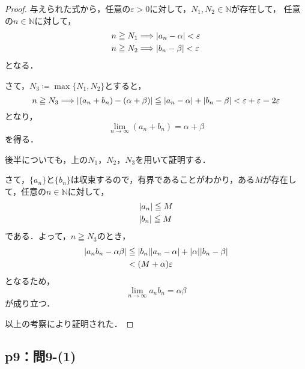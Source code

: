 \documentclass[uplatex,dvipdfmx,a4paper,10pt,fleqn]{jsarticle}
\newenvironment{tleftbar}{\begin{tbleftline}\setlength{\parindent}{1zw}}{\end{tbleftline}}
\begin{document}
    \begin{tleftbar}
        \begin{proof}
        与えられた式から，任意の$\varepsilon >0$に対して，$N_1 , N_2 \in \mathbb{N}$が存在して，
        任意の$n \in \mathbb{N}$に対して，
        \begin{align*} 
            & n \geqq N_1 \Longrightarrow \abs{a_n - \alpha}<\varepsilon \\
            & n \geqq N_2 \Longrightarrow \abs{b_n - \beta}<\varepsilon 
        \end{align*} 
        となる．

        さて，$N_3 \coloneqq \max \{ N_1 , N_2 \}$とすると，
        \[
           n \geqq N_3  \Longrightarrow \abs{(a_n+b_n)-(\alpha + \beta) } \leqq  \abs{a_n - \alpha}+\abs{b_n-\beta}<\varepsilon +\varepsilon=2\varepsilon 
         \]
         となり，
         \[
            \lim_{n \to \infty} (a_n + b_n)= \alpha + \beta
         \]
         を得る．

         後半についても，上の$N_1$，$N_2$，$N_3$を用いて証明する．

         さて，$\{ a_n \}$と$\{ b_n \}$は収束するので，有界であることがわかり，ある$M$が存在して，任意の$n \in \mathbb{N}$に対して，
         \begin{align*} 
            &\abs{a_n} \leqq M \\
            & \abs{b_n} \leqq M 
         \end{align*} 
         である．よって，$n \geqq N_3$のとき，
         \begin{align*} 
            \abs{a_n b_n - \alpha \beta} & \leqq \abs{b_n} \abs{a_n -\alpha } + \abs{\alpha} \abs{b_n -\beta} \\
            & < (M+\alpha )\varepsilon 
         \end{align*} 
         となるため，
         \[
            \lim_{n \to \infty} a_n b_n = \alpha \beta
         \]
         が成り立つ．

         以上の考察により証明された．
        \end{proof}
        \end{tleftbar}



    \subsection*{p9：問9-(1)}
\end{document}
